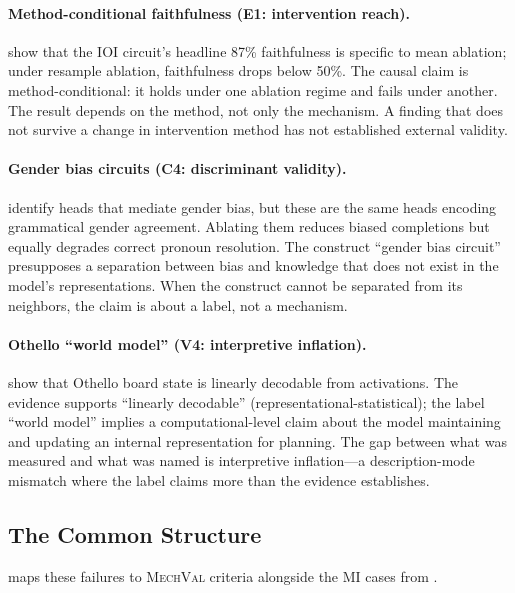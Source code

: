 \documentclass{article}
\newcommand{\mechval}{\textsc{MechVal}}
\begin{document}
\paragraph{Method-conditional faithfulness (E1: intervention reach).}
\citet{miller2024transformer} show that the IOI circuit's headline 87\% faithfulness is specific to mean ablation; under resample ablation, faithfulness drops below 50\%. The causal claim is method-conditional: it holds under one ablation regime and fails under another. The result depends on the method, not only the mechanism. A finding that does not survive a change in intervention method has not established external validity.

\paragraph{Gender bias circuits (C4: discriminant validity).}
\citet{vig2020gender} identify heads that mediate gender bias, but these are the same heads encoding grammatical gender agreement. Ablating them reduces biased completions but equally degrades correct pronoun resolution. The construct ``gender bias circuit'' presupposes a separation between bias and knowledge that does not exist in the model's representations. When the construct cannot be separated from its neighbors, the claim is about a label, not a mechanism.

\paragraph{Othello ``world model'' (V4: interpretive inflation).}
\citet{li2023othello} show that Othello board state is linearly decodable from activations. The evidence supports ``linearly decodable'' (representational-statistical); the label ``world model'' implies a computational-level claim about the model maintaining and updating an internal representation for planning. The gap between what was measured and what was named is interpretive inflation---a description-mode mismatch where the label claims more than the evidence establishes.

\subsection{The Common Structure}

 maps these failures to \mechval{} criteria alongside the MI cases from .
\end{document}
